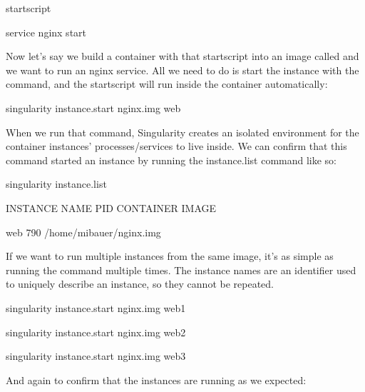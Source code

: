 \documentclass[letterpaper,10pt,english]{sphinxmanual}
\begin{document}
%
\begin{sphinxVerbatim}[commandchars=\\\{\}]
\PYGZpc{}startscript


service nginx start
\end{sphinxVerbatim}

Now let’s say we build a container with that startscript into an image
called  and we want to run an nginx service. All we need to do is start
the instance with the  command, and the
startscript will run inside the container automatically:

%
\begin{sphinxVerbatim}

\PYGZdl{} singularity instance.start   nginx.img  web
\end{sphinxVerbatim}

When we run that command, Singularity creates an isolated environment
for the container instances’ processes/services to live inside. We can
confirm that this command started an instance by running the
instance.list command like so:

%
\begin{sphinxVerbatim}[commandchars=\\\{\}]
\PYGZdl{} singularity instance.list

INSTANCE NAME    PID      CONTAINER IMAGE

web              790      /home/mibauer/nginx.img
\end{sphinxVerbatim}

If we want to run multiple instances from the same image, it’s as simple
as running the command multiple times. The instance names are an
identifier used to uniquely describe an instance, so they cannot be
repeated.

%
\begin{sphinxVerbatim}[commandchars=\\\{\}]
\PYGZdl{} singularity instance.start   nginx.img  web1

\PYGZdl{} singularity instance.start   nginx.img  web2

\PYGZdl{} singularity instance.start   nginx.img  web3
\end{sphinxVerbatim}

And again to confirm that the instances are running as we expected:
\end{document}
